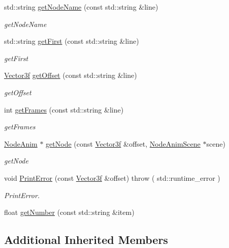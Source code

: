 \begin{DoxyCompactItemize}
std\+::string \hyperlink{classEngine_1_1BvhLoader_a7130a9d03688b504b3b6bbe27010ddad}{get\+Node\+Name} (const std\+::string \&line)
\begin{DoxyCompactList}\small\item\em get\+Node\+Name \end{DoxyCompactList}\item 
std\+::string \hyperlink{classEngine_1_1BvhLoader_afefebc57a1204d9244b097664e223f35}{get\+First} (const std\+::string \&line)
\begin{DoxyCompactList}\small\item\em get\+First \end{DoxyCompactList}\item 
\hyperlink{classVector3}{Vector3f} \hyperlink{classEngine_1_1BvhLoader_a9a79af2338a7c428076b212823d3d714}{get\+Offset} (const std\+::string \&line)
\begin{DoxyCompactList}\small\item\em get\+Offset \end{DoxyCompactList}\item 
int \hyperlink{classEngine_1_1BvhLoader_a8704cf6e1c413be669d2322ee8db9fb5}{get\+Frames} (const std\+::string \&line)
\begin{DoxyCompactList}\small\item\em get\+Frames \end{DoxyCompactList}\item 
\hyperlink{classEngine_1_1NodeAnim}{Node\+Anim} $\ast$ \hyperlink{classEngine_1_1BvhLoader_ad4528687a88e9e6fceff3d8de2f571a2}{get\+Node} (const \hyperlink{classVector3}{Vector3f} \&offset, \hyperlink{classEngine_1_1NodeAnimScene}{Node\+Anim\+Scene} $\ast$scene)
\begin{DoxyCompactList}\small\item\em get\+Node \end{DoxyCompactList}\item 
void \hyperlink{classEngine_1_1BvhLoader_af328fc4f00cb017298b5a979f27a0f63}{Print\+Error} (const \hyperlink{classVector3}{Vector3f} \&offset)  throw ( std\+::runtime\+\_\+error )
\begin{DoxyCompactList}\small\item\em Print\+Error. \end{DoxyCompactList}\item 
float \hyperlink{classEngine_1_1BvhLoader_a57670cf4d7d33cf1f45c6643f940b271}{get\+Number} (const std\+::string \&item)
\end{DoxyCompactItemize}
\subsection*{Additional Inherited Members}


